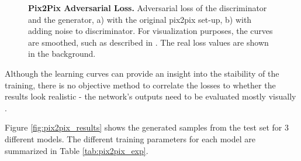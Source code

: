 \documentclass[12pt]{report}
\begin{document}
\begin{figure}[t]
\centering
{}
\caption{\label{fig:pix2pix_losses} \textbf{Pix2Pix Adversarial Loss.} Adversarial loss of the discriminator and the generator, a) with the original pix2pix set-up, b) with adding noise to discriminator. For visualization purposes, the curves are smoothed, such as described in \cite{noauthor_tensorflows_2018}. The real loss values are shown in the background.}
\end{figure}

Although the learning curves can provide an insight into the staibility of the training, there is no objective method to correlate the losses to whether the results look realistic - the network's outputs need to be evaluated mostly visually \cite{preserve_knowledge_how_nodate}. 

Figure \ref{fig:pix2pix_results} shows the generated samples from the test set for 3 different models. The different training parameters for each model are summarized in Table \ref{tab:pix2pix_exp}. 
\end{document}

